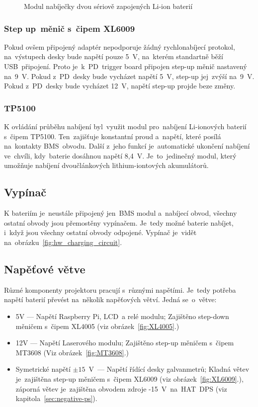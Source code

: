 \begin{figure}[htb]
\begin{minipage}{0.3\textwidth}
    \caption{\label{fig:TP5100} Modul nabíječky dvou sériově zapojených Li-ion baterií~\cite{laskakit-TP5100}}
  \end{minipage}
\end{figure}

\subsubsection{Step up~měnič s~čipem XL6009}
Pokud ovšem připojený adaptér nepodporuje žádný rychlonabíjecí protokol, na~výstupech desky bude napětí pouze 5~V, na~kterém standartně běží USB~připojení. Proto je~k~PD~trigger board připojen step-up měnič nastavený na~9~V.
Pokud z~PD~desky bude vycházet napětí 5~V, step-up jej~zvýší na~9~V. Pokud z~PD~desky bude vycházet 12~V, napětí step-up projde beze změny.

\subsubsection{TP5100}
K ovládání průběhu nabíjení byl~využit modul pro~nabíjení Li-ionových baterií s~čipem TP5100. Ten~zajišťuje konstantní proud a~napětí, které posílá na~kontakty BMS~obvodu. Další z~jeho funkcí je~automatické ukončení nabíjení ve~chvíli, kdy~baterie dosáhnou napětí 8,4~V. Je~to~jedinečný modul, který umožňuje nabíjení dvoučlánkových lithium-iontových akumulátorů.

\subsection{Vypínač}
K bateriím je~neustále připojený jen~BMS modul a~nabíjecí obvod, všechny ostatní obvody jsou přemostěny vypínačem. Je~tedy možné baterie nabíjet, i~když jsou všechny ostatní obvody odpojené. Vypínač je~vidět na~obrázku~\ref{fig:hw_charging_circuit}.

\subsection{Napěťové větve}
Různé komponenty projektoru pracují s~různými napětími. Je~tedy potřeba napětí baterií převést na~několik napěťových větví. Jedná se~o~větve:

\begin{itemize}
  \item 5V --- Napětí Raspberry Pi, LCD~a relé modulu; Zajištěno step-down měničem s~čipem XL4005 (viz obrázek~\ref{fig:XL4005}.)
  \item 12V --- Napětí Laserového modulu; Zajištěno step-up měničem s~čipem MT3608 (Viz obrázek~\ref{fig:MT3608}.)
  \item Symetrické napětí $\pm{}15$~V~--- Napětí řídící desky galvanmetrů; Kladná větev je~zajištěna step-up měničem s~čipem XL6009 (viz obrázek~\ref{fig:XL6009}.), záporná větev je~zajištěna obvodem zdroje -15~V~na~HAT~DPS (viz kapitola~\ref{sec:negative-ps}).
\end{itemize}


